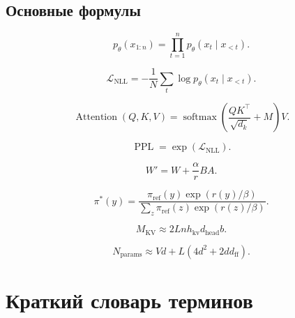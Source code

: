 \documentclass[12pt,a4paper]{article}
\DeclareMathOperator{\softmax}{softmax}
\newcommand{\1}{\mathbf{1}}
\theoremstyle{definition}
\theoremstyle{remark}
\begin{document}
\subsection{Основные формулы}

\[
p_\theta(x_{1:n})
=
\prod_{t=1}^{n}p_\theta(x_t\mid x_{<t}).
\]

\[
\mathcal{L}_{\mathrm{NLL}}
=
-\frac{1}{N}
\sum_t
\log p_\theta(x_t\mid x_{<t}).
\]

\[
\operatorname{Attention}(Q,K,V)
=
\softmax
\left(
\frac{QK^\top}{\sqrt{d_k}}+M
\right)V.
\]

\[
\operatorname{PPL}
=
\exp(\mathcal{L}_{\mathrm{NLL}}).
\]

\[
W'=W+\frac{\alpha}{r}BA.
\]

\[
\pi^\ast(y)
=
\frac{
\pi_{\mathrm{ref}}(y)\exp(r(y)/\beta)
}{
\sum_z\pi_{\mathrm{ref}}(z)\exp(r(z)/\beta)
}.
\]

\[
M_{\mathrm{KV}}
\approx
2Lnh_{\mathrm{kv}}d_{\mathrm{head}}b.
\]

\[
N_{\mathrm{params}}
\approx
Vd+
L\left(4d^2+2dd_{\mathrm{ff}}\right).
\]

\appendix
\section{Краткий словарь терминов}
\end{document}
